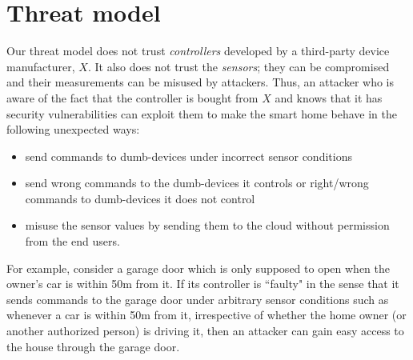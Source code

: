 \documentclass{article}
\begin{document}

\section{Threat model}
\label{sec:threat}

Our threat model does not trust \textit{controllers} developed by a third-party device manufacturer, $X$. It also does not trust the \textit{sensors}; they can be compromised and their measurements can be misused by attackers. Thus, an attacker who is aware of the fact that the controller is bought from $X$ and knows that it has security vulnerabilities can exploit them to make the smart home behave in the following unexpected ways:
\begin{itemize}[topsep=0pt,itemsep=-1ex,partopsep=1ex,parsep=1ex]
\item send commands to dumb-devices under incorrect sensor conditions
\item send wrong commands to the dumb-devices it controls or right/wrong commands to dumb-devices it does not control
\item misuse the sensor values by sending them to the cloud without permission from the end users.
\end{itemize}
For example, consider a garage door which is only supposed to open when the owner's car is within 50m from it. If its controller is ``faulty" in the sense that it sends commands to the garage door under arbitrary sensor conditions such as whenever a car is within 50m from it, irrespective of whether the home owner (or another authorized person) is driving it, then an attacker can gain easy access to the house through the garage door. 
\end{document}
